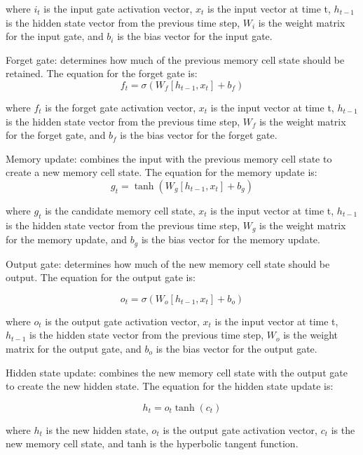 \documentclass[a4paper]{sapthesis}
\begin{document}
where $i_t$ is the input gate activation vector, $x_t$ is the input vector 
at time t, $h_{t-1}$ is the hidden state vector from the previous time 
step, $W_i$ is the weight matrix for the input gate, and $b_i$ is the bias 
vector for the input gate.

Forget gate: determines how much of the previous memory cell state 
should be retained. The equation for the forget gate is:
\begin{equation}
  f_t = \sigma(W_f [h_{t-1}, x_t] + b_f)
  \end{equation}

where $f_t$ is the forget gate activation vector, $x_t$ is the input 
vector at time t, $h_{t-1}$ is the hidden state vector from the previous time
 step, $W_f$ is the weight matrix for the forget gate, and $b_f$ is the bias 
 vector for the forget gate.

Memory update: combines the input with the previous memory cell
 state to create a new memory cell state. The equation for the
  memory update is:
  \begin{equation}
    g_t = \tanh(W_g [h_{t-1}, x_t] + b_g)
    \end{equation}

where $g_t$ is the candidate memory cell state, $x_t$ is the input vector 
at time t, $h_{t-1}$ is the hidden state vector from the previous time step,
 $W_g$ is the weight matrix for the memory update, and $b_g$ is the bias vector
  for the memory update.

Output gate: determines how much of the new memory cell state should be 
output. The equation for the output gate is:

\begin{equation}
  o_t = \sigma(W_o [h_{t-1}, x_t] + b_o)
  \end{equation}

where $o_t$ is the output gate activation vector, $x_t$ is the input vector
 at time t, $h_{t-1}$ is the hidden state vector from the previous time step,
  $W_o$ is the weight matrix for the output gate, and $b_o$ is the bias vector 
  for the output gate.

Hidden state update: combines the new memory cell state with the output gate
 to create the new hidden state. The equation for the hidden state update is:

 \begin{equation}
  h_t = o_t \tanh(c_t)
  \end{equation}

where $h_t$ is the new hidden state, $o_t$ is the output gate activation vector,
 $c_t$ is the new memory cell state, and tanh is the hyperbolic tangent function.
\end{document}
